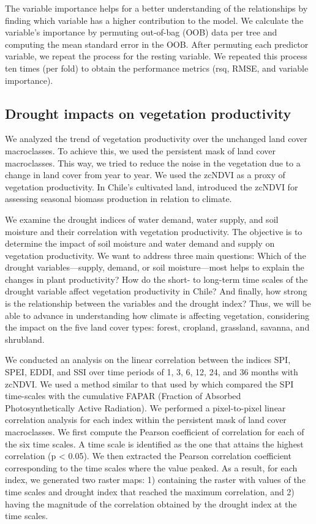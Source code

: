 \documentclass[
  authoryear,
  preprint,
  3p,
  onecolumn]{elsarticle}
\begin{document}
The variable importance helps for a better understanding of the
relationships by finding which variable has a higher contribution to the
model. We calculate the variable's importance by permuting out-of-bag
(OOB) data per tree and computing the mean standard error in the OOB.
After permuting each predictor variable, we repeat the process for the
resting variable. We repeated this process ten times (per fold) to
obtain the performance metrics (rsq, RMSE, and variable importance).

\hypertarget{drought-impacts-on-vegetation-productivity}{%
\subsection{Drought impacts on vegetation
productivity}\label{drought-impacts-on-vegetation-productivity}}

We analyzed the trend of vegetation productivity over the unchanged land
cover macroclasses. To achieve this, we used the persistent mask of land
cover macroclasses. This way, we tried to reduce the noise in the
vegetation due to a change in land cover from year to year. We used the
zcNDVI as a proxy of vegetation productivity. In Chile's cultivated
land, \citet{Zambrano2018} introduced the zcNDVI for assessing seasonal
biomass production in relation to climate.

We examine the drought indices of water demand, water supply, and soil
moisture and their correlation with vegetation productivity. The
objective is to determine the impact of soil moisture and water demand
and supply on vegetation productivity. We want to address three main
questions: Which of the drought variables---supply, demand, or soil
moisture---most helps to explain the changes in plant productivity? How
do the short- to long-term time scales of the drought variable affect
vegetation productivity in Chile? And finally, how strong is the
relationship between the variables and the drought index? Thus, we will
be able to advance in understanding how climate is affecting vegetation,
considering the impact on the five land cover types: forest, cropland,
grassland, savanna, and shrubland.

We conducted an analysis on the linear correlation between the indices
SPI, SPEI, EDDI, and SSI over time periods of 1, 3, 6, 12, 24, and 36
months with zcNDVI. We used a method similar to that used by
\citet{Meroni2017} which compared the SPI time-scales with the
cumulative FAPAR (Fraction of Absorbed Photosynthetically Active
Radiation). We performed a pixel-to-pixel linear correlation analysis
for each index within the persistent mask of land cover macroclasses. We
first compute the Pearson coefficient of correlation for each of the six
time scales. A time scale is identified as the one that attains the
highest correlation (p \textless{} 0.05). We then extracted the Pearson
correlation coefficient corresponding to the time scales where the value
peaked. As a result, for each index, we generated two raster maps: 1)
containing the raster with values of the time scales and drought index
that reached the maximum correlation, and 2) having the magnitude of the
correlation obtained by the drought index at the time scales.
\end{document}
